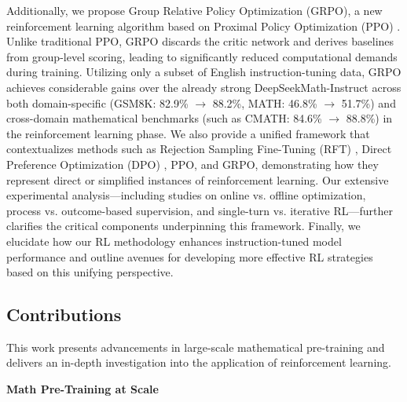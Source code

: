 Additionally, we propose Group Relative Policy Optimization (GRPO), a new reinforcement learning algorithm based on Proximal Policy Optimization (PPO) \citep{schulman2017proximal}. Unlike traditional PPO, GRPO discards the critic network and derives baselines from group-level scoring, leading to significantly reduced computational demands during training. Utilizing only a subset of English instruction-tuning data, GRPO achieves considerable gains over the already strong DeepSeekMath-Instruct across both domain-specific (GSM8K: 82.9\% $\rightarrow$ 88.2\%, MATH: 46.8\% $\rightarrow$ 51.7\%) and cross-domain mathematical benchmarks (such as CMATH: 84.6\% $\rightarrow$ 88.8\%) in the reinforcement learning phase. We also provide a unified framework that contextualizes methods such as Rejection Sampling Fine-Tuning (RFT) \citep{yuan2023scaling}, Direct Preference Optimization (DPO) \citep{dpo}, PPO, and GRPO, demonstrating how they represent direct or simplified instances of reinforcement learning. Our extensive experimental analysis—including studies on online vs. offline optimization, process vs. outcome-based supervision, and single-turn vs. iterative RL—further clarifies the critical components underpinning this framework. Finally, we elucidate how our RL methodology enhances instruction-tuned model performance and outline avenues for developing more effective RL strategies based on this unifying perspective.

\subsection{Contributions}
This work presents advancements in large-scale mathematical pre-training and delivers an in-depth investigation into the application of reinforcement learning.

\textbf{Math Pre-Training at Scale}

